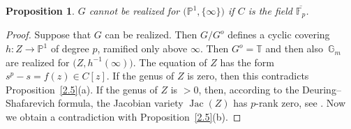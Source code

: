 \documentclass[pdftex]{sigma}
\numberwithin{equation}{section}
\newtheorem{Proposition}[Theorem]{Proposition}
\begin{document}
\begin{Proposition} \label{2.6} $G$ cannot be realized for $\big(\mathbb{P}^1,\{\infty \}\big)$ if $C$ is the field $\overline{\mathbb{F}_p}$.
\end{Proposition}
\begin{proof} Suppose that $G$ can be realized. Then $G/G^o$ defines a cyclic covering $h\colon Z\rightarrow \mathbb{P}^1$ of degree $p$, ramified only above $\infty$. Then $G^o=\mathbb{T}$ and then also~$\mathbb{G}_m$ are realized for $\big(Z,h^{-1}(\infty)\big)$. The equation of $Z$ has the form $s^p-s=f(z)\in C[z]$. If the genus of $Z$ is zero, then this contradicts Proposition~\ref{2.5}(a). If the genus of $Z$ is $>0$, then, according to the Deuring--Shafarevich formula, the Jacobian variety $\operatorname{Jac}(Z)$ has $p$-rank zero, see \cite[Theorem~1.1]{Sh}. Now we obtain a contradiction with Proposition~\ref{2.5}(b). \end{proof}
\end{document}
